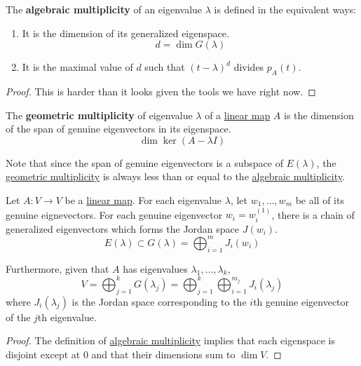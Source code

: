 	\begin{definition}
	  \label{def:algebraic-multiplicity}
    The \textbf{algebraic multiplicity} of an eigenvalue $\lambda$ is defined in the equivalent ways: 
		\begin{enumerate}
		  \item It is the dimension of its generalized eigenspace.
				\begin{equation}
					d = \dim{G(\lambda)}
				\end{equation}

			\item It is the maximal value of $d$ such that $(t - \lambda)^{d}$ divides $p_A (t)$. 
		\end{enumerate}
  \end{definition}
	\begin{proof}
	  This is harder than it looks given the tools we have right now. 
	\end{proof}

	\begin{definition}
	  \label{def:geometric-multiplicity}
		The \textbf{geometric multiplicity} of eigenvalue $\lambda$ of a \hyperref[def:linear_map]{linear map} $A$ is the dimension of the span of genuine eigenvectors in its eigenspace. 
		\begin{equation}
    	\dim{\ker{(A - \lambda I)}}
		\end{equation}
  \end{definition}

	Note that since the span of genuine eigenvectors is a subspace of $E(\lambda)$, the \hyperref[def:geometric-multiplicity]{geometric multiplicity} is always less than or equal to the \hyperref[def:algebraic-multiplicity]{algebraic multiplicity}. 

	\begin{theorem}
		\label{thm:eigendecomposition}
		Let $A: V \to V$ be a \hyperref[def:linear_map]{linear map}. For each eigenvalue $\lambda$, let $w_1, \ldots, w_m$ be all of its genuine eignevectors. For each genuine eigenvector $w_i = w_i^{(1)}$, there is a chain of generalized eigenvectors which forms the Jordan space $J(w_i)$. 
		\begin{equation}
			E(\lambda) \subset G(\lambda) = \bigoplus_{i=1}^m J_i(w_i)
		\end{equation} 

		Furthermore, given that $A$ has eigenvalues $\lambda_1, \ldots, \lambda_k$, 
		\begin{equation}
			V = \bigoplus_{j=1}^k G(\lambda_j) = \bigoplus_{j=1}^k \bigoplus_{i=1}^{m_j} J_i (\lambda_j)
		\end{equation}
		where $J_i (\lambda_j)$ is the Jordan space corresponding to the $i$th genuine eigenvector of the $j$th eigenvalue. 
  \end{theorem}
  \begin{proof}
    The definition of \hyperref[def:algebraic-multiplicity]{algebraic multiplicity} implies that each eigenspace is disjoint except at $0$ and that their dimensions sum to $\dim{V}$. 
  \end{proof}

